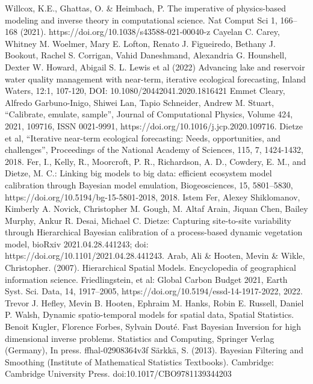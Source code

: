 \documentclass[12pt]{article}
\begin{document}
\begin{thebibliography}{20}
 Willcox, K.E., Ghattas, O. \& Heimbach, P. The imperative of physics-based modeling and inverse theory in computational science. Nat Comput Sci 1, 166–168 (2021). https://doi.org/10.1038/s43588-021-00040-z
 Cayelan C. Carey, Whitney M. Woelmer, Mary E. Lofton, Renato J. Figueiredo, Bethany J. Bookout, Rachel S. Corrigan, Vahid Daneshmand, Alexandria G. Hounshell, Dexter W. Howard, Abigail S. L. Lewis et al (2022) Advancing lake and reservoir water quality management with near-term, iterative ecological forecasting, Inland Waters, 12:1, 107-120, DOI: 10.1080/20442041.2020.1816421
 Emmet Cleary, Alfredo Garbuno-Inigo, Shiwei Lan, Tapio Schneider, Andrew M. Stuart, “Calibrate, emulate, sample”, Journal of Computational Physics, Volume 424, 2021, 109716, ISSN 0021-9991, https://doi.org/10.1016/j.jcp.2020.109716.
 Dietze et al, “Iterative near-term ecological forecasting: Needs, opportunities, and challenges”, Proceedings of the National Academy of Sciences, 115, 7, 1424-1432, 2018.
 Fer, I., Kelly, R., Moorcroft, P. R., Richardson, A. D., Cowdery, E. M., and Dietze, M. C.: Linking big models to big data: efficient ecosystem model calibration through Bayesian model emulation, Biogeosciences, 15, 5801–5830, https://doi.org/10.5194/bg-15-5801-2018, 2018.
 Istem Fer, Alexey Shiklomanov, Kimberly A. Novick, Christopher M. Gough, M. Altaf Arain, Jiquan Chen, Bailey Murphy, Ankur R. Desai, Michael C. Dietze: Capturing site-to-site variability through Hierarchical Bayesian calibration of a process-based dynamic vegetation model, bioRxiv 2021.04.28.441243; doi: https://doi.org/10.1101/2021.04.28.441243. 
 Arab, Ali \& Hooten, Mevin \& Wikle, Christopher. (2007). Hierarchical Spatial Models. Encyclopedia of geographical information science.
 Friedlingstein, et al: Global Carbon Budget 2021, Earth Syst. Sci. Data, 14, 1917–2005, https://doi.org/10.5194/essd-14-1917-2022, 2022.
 Trevor J. Hefley, Mevin B. Hooten, Ephraim M. Hanks, Robin E. Russell, Daniel P. Walsh, Dynamic spatio-temporal models for spatial data, Spatial Statistics.
 Benoit Kugler, Florence Forbes, Sylvain Douté. Fast Bayesian Inversion for high dimensional inverse problems. Statistics and Computing, Springer Verlag (Germany), In press. ffhal-02908364v3f
 Särkkä, S. (2013). Bayesian Filtering and Smoothing (Institute of Mathematical Statistics Textbooks). Cambridge: Cambridge University Press. doi:10.1017/CBO9781139344203

\end{thebibliography}
\end{document}
